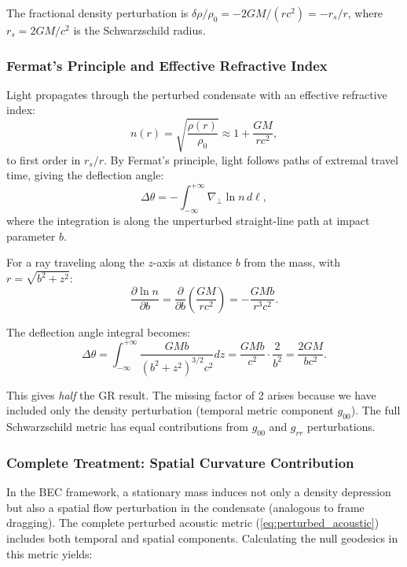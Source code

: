 \documentclass[11pt,a4paper]{article}
\theoremstyle{definition}
\theoremstyle{remark}
\begin{document}
The fractional density perturbation is $\delta\rho/\rho_0 = -2GM/(rc^2) = -r_s/r$, where $r_s = 2GM/c^2$ is the Schwarzschild radius.

\subsubsection{Fermat's Principle and Effective Refractive Index}

Light propagates through the perturbed condensate with an effective refractive index:
\begin{equation}
\label{eq:refractive_index}
n(r) = \sqrt{\frac{\rho(r)}{\rho_0}} \approx 1 + \frac{GM}{rc^2},
\end{equation}
to first order in $r_s/r$. By Fermat's principle, light follows paths of extremal travel time, giving the deflection angle:
\begin{equation}
\label{eq:deflection_integral}
\Delta\theta = -\int_{-\infty}^{+\infty} \nabla_\perp \ln n \, d\ell,
\end{equation}
where the integration is along the unperturbed straight-line path at impact parameter $b$.

For a ray traveling along the $z$-axis at distance $b$ from the mass, with $r = \sqrt{b^2 + z^2}$:
\begin{equation}
\frac{\partial \ln n}{\partial b} = \frac{\partial}{\partial b}\left(\frac{GM}{rc^2}\right) = -\frac{GM b}{r^3 c^2}.
\end{equation}

The deflection angle integral becomes:
\begin{equation}
\Delta\theta = \int_{-\infty}^{+\infty} \frac{GM b}{(b^2 + z^2)^{3/2} c^2} dz = \frac{GM b}{c^2} \cdot \frac{2}{b^2} = \frac{2GM}{bc^2}.
\end{equation}

This gives \emph{half} the GR result. The missing factor of 2 arises because we have included only the density perturbation (temporal metric component $g_{00}$). The full Schwarzschild metric has equal contributions from $g_{00}$ and $g_{rr}$ perturbations.

\subsubsection{Complete Treatment: Spatial Curvature Contribution}

In the BEC framework, a stationary mass induces not only a density depression but also a spatial flow perturbation in the condensate (analogous to frame dragging). The complete perturbed acoustic metric (\ref{eq:perturbed_acoustic}) includes both temporal and spatial components. Calculating the null geodesics in this metric yields:
\end{document}
